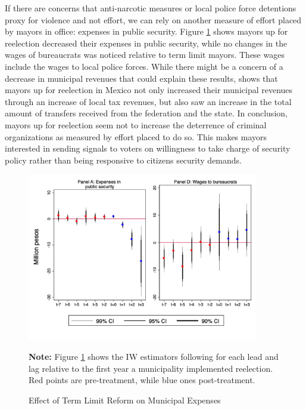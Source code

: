 If there are concerns that anti-narcotic measures or local police force detentions proxy for violence and not effort, we can rely on another measure of effort placed by mayors in office: expenses in public security. Figure \ref{fig:expenses} shows mayors up for reelection decreased their expenses in public security, while no changes in the wages of bureaucrats was noticed relative to term limit mayors. These wages include the wages to local police forces. %
While there might be a concern of a decrease in municipal revenues that could explain these results, \citet{ch_2021} shows that mayors up for reelection in Mexico not only increased their municipal revenues through an increase of local tax revenues, but also saw an increase in the total amount of transfers received from the federation and the state. In conclusion, mayors up for  reelection seem not to increase the deterrence of criminal organizations as measured by effort placed to do so. This makes mayors interested in sending signals to voters on willingness to take charge of security policy rather than being responsive to citizens security demands. 
  
 \begin{figure}[H]   
\centering
 \caption{Effect of Term Limit Reform on Municipal Expenses}
 \label{fig:expenses}
\includegraphics[width=0.9\textwidth]{Figures/expenses_allyears.png}
       \captionsetup{justification=centering}
         
 \textbf{Note:} Figure \ref{fig:expenses} shows the IW estimators following \citet{abraham_sun_2020} for each lead and lag relative to the first year a municipality implemented reelection. Red points are pre-treatment, while blue ones post-treatment. 
                     
\end{figure}   


